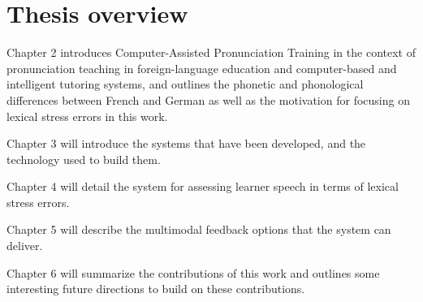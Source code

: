\section{Thesis overview}
\label{sec:intro:overview}

{\thesisparagraphfont Chapter 2} introduces Computer-Assisted Pronunciation Training in the context of pronunciation teaching in foreign-language education and computer-based and intelligent tutoring systems, and outlines the phonetic and phonological differences between French and German as well as the motivation for focusing on lexical stress errors in this work.


{\thesisparagraphfont Chapter 3} will introduce the systems that have been developed, and the technology used to build them.

{\thesisparagraphfont Chapter 4} will detail the system for assessing learner speech in terms of lexical stress errors.

{\thesisparagraphfont Chapter 5} will describe the multimodal feedback options that the system can deliver.

{\thesisparagraphfont Chapter 6} will summarize the contributions of this work and outlines some interesting future directions to build on these contributions.



